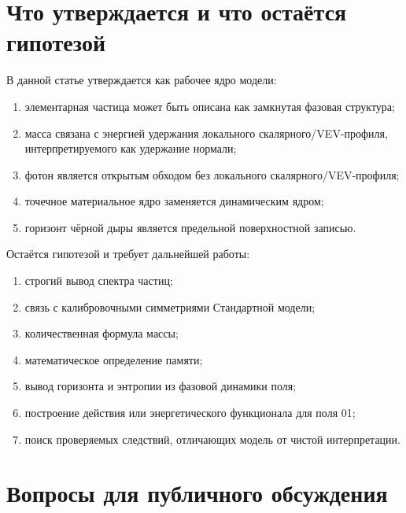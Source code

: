 \documentclass[11pt,a4paper]{article}
\begin{document}
\section{Что утверждается и что остаётся гипотезой}

В данной статье утверждается как рабочее ядро модели:
\begin{enumerate}
\item элементарная частица может быть описана как замкнутая фазовая структура;
\item масса связана с энергией удержания локального скалярного/VEV-профиля, интерпретируемого как удержание нормали;
\item фотон является открытым обходом без локального скалярного/VEV-профиля;
\item точечное материальное ядро заменяется динамическим ядром;
\item горизонт чёрной дыры является предельной поверхностной записью.
\end{enumerate}

Остаётся гипотезой и требует дальнейшей работы:
\begin{enumerate}
\item строгий вывод спектра частиц;
\item связь с калибровочными симметриями Стандартной модели;
\item количественная формула массы;
\item математическое определение памяти;
\item вывод горизонта и энтропии из фазовой динамики поля;
\item построение действия или энергетического функционала для поля 01;
\item поиск проверяемых следствий, отличающих модель от чистой интерпретации.
\end{enumerate}

\section{Вопросы для публичного обсуждения}
\end{document}
